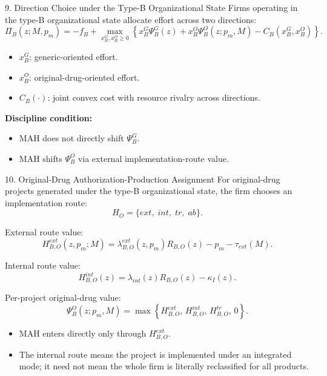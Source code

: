 \documentclass[aspectratio=169,11pt]{beamer}
\begin{document}
\begin{frame}{9. Direction Choice under the Type-B Organizational State}
\small
Firms operating in the type-B organizational state allocate effort across two directions:
\[
\Pi_B(z;M,p_m)
=
-f_B+
\max_{x_B^G,x_B^O\ge 0}
\left\{
x_B^G\Psi_B^G(z)
+
x_B^O\Psi_B^O(z;p_m,M)
-
C_B(x_B^G,x_B^O)
\right\}.
\]

\begin{itemize}
    \item \(x_B^G\): generic-oriented effort.
    \item \(x_B^O\): original-drug-oriented effort.
    \item \(C_B(\cdot)\): joint convex cost with resource rivalry across directions.
\end{itemize}

\vspace{0.15cm}
\textbf{Discipline condition:}
\begin{itemize}
    \item MAH does not directly shift \(\Psi_B^G\).
    \item MAH shifts \(\Psi_B^O\) via external implementation-route value.
\end{itemize}
\end{frame}

\begin{frame}{10. Original-Drug Authorization-Production Assignment}
\small
For original-drug projects generated under the type-B organizational state, the firm chooses an implementation route:
\[
H_O=\{ext,\; int,\; tr,\; ab\}.
\]

External route value:
\[
H_{B,O}^{ext}(z,p_m;M)=\lambda_{B,O}^{ext}(z,p_m)R_{B,O}(z)-p_m-\tau_{ext}(M).
\]

Internal route value:
\[
H_{B,O}^{int}(z)=\lambda_{int}(z)R_{B,O}(z)-\kappa_I(z).
\]

Per-project original-drug value:
\[
\Psi_B^O(z;p_m,M)=
\max\left\{
H_{B,O}^{ext},\,
H_{B,O}^{int},\,
H_{B,O}^{tr},\,
0
\right\}.
\]

\begin{itemize}
    \item MAH enters directly only through \(H_{B,O}^{ext}\).
    \item The internal route means the project is implemented under an integrated mode; it need not mean the whole firm is literally reclassified for all products.
\end{itemize}
\end{frame}
\end{document}
